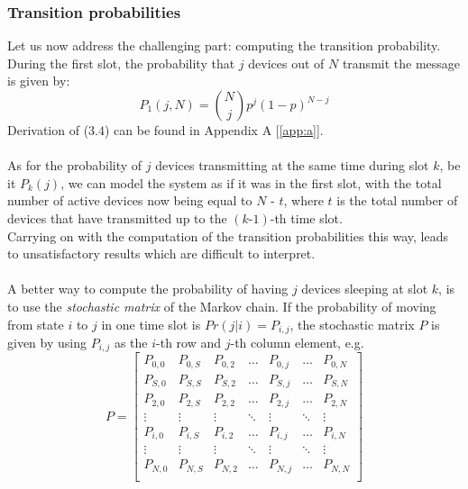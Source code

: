 \subsubsection{Transition probabilities}
Let us now address the challenging part: computing the transition probability.\\
During the first slot, the probability that $j$ devices out of $N$ transmit
the message is given by:
\begin{equation}
    P_{1}(j, N) = {N \choose j} p^{j} (1 - p)^{N - j}
    \label{eq:firstSlotTransProb}
\end{equation}
Derivation of ($3.4$) can be found in Appendix A [\ref{app:a}].\\
\\
As for the probability of $j$ devices transmitting at the same time during slot
$k$, be it $P_{k}(j)$, we can model the system as if it was in the first slot,
with the total number of active devices now being equal to $N$ - $t$, where $t$
is the total number of devices that have transmitted up to the $(k\text{-}1)$-th
time slot.\\
Carrying on with the computation of the transition probabilities this way, leads
to unsatisfactory results which are difficult to interpret.\\
\\
A better way to compute the probability of having $j$ devices sleeping at
slot $k$, is to use the \textit{stochastic matrix} of the Markov chain. If the
probability of moving from state $i$ to $j$ in one time slot is
$Pr(j|i) = P_{i,j}$, the stochastic matrix $P$ is given by using
$P_{i,j}$ as the $i$-th row and $j$-th column element, e.g.
\begin{equation*}
P = 
\begin{bmatrix}
P_{0,0}	& P_{0,S}	& P_{0,2}	& \dots  	& P_{0,j}	& \dots		& P_{0,N} \\
P_{S,0}	& P_{S,S}	& P_{S,2}	& \dots  	& P_{S,j}	& \dots		& P_{S,N} \\
P_{2,0}	& P_{2,S}	& P_{2,2}	& \dots  	& P_{2,j}	& \dots		& P_{2,N} \\
\vdots	& \vdots	& \vdots	& \ddots 	& \vdots	& \ddots	& \vdots \\
P_{i,0}	& P_{i,S}	& P_{i,2}	& \dots		& P_{i,j}	& \dots		& P_{i,N} \\
\vdots	& \vdots	& \vdots	& \ddots	& \vdots	& \ddots	& \vdots \\
P_{N,0}	& P_{N,S}	& P_{N,2}	& \dots		& P_{N,j}	& \dots		& P_{N,N} \\
\end{bmatrix}
\label{stochasticMatrix1}
\end{equation*}

